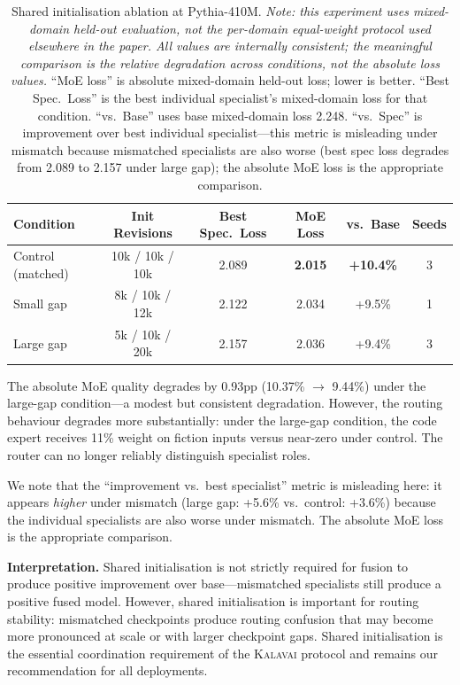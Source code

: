 \documentclass{article}
\newcommand{\kalavai}{\textsc{Kalavai}\xspace}
\begin{document}
\begin{table}[h]
\centering
\caption{Shared initialisation ablation at Pythia-410M. \emph{Note: this experiment uses mixed-domain held-out evaluation, not the per-domain equal-weight protocol used elsewhere in the paper. All values are internally consistent; the meaningful comparison is the relative degradation across conditions, not the absolute loss values.} ``MoE loss'' is absolute mixed-domain held-out loss; lower is better. ``Best Spec.\ Loss'' is the best individual specialist's mixed-domain loss for that condition. ``vs.\ Base'' uses base mixed-domain loss 2.248. ``vs.\ Spec'' is improvement over best individual specialist---this metric is misleading under mismatch because mismatched specialists are also worse (best spec loss degrades from 2.089 to 2.157 under large gap); the absolute MoE loss is the appropriate comparison.}
\label{tab:sharedinit}
\begin{tabular}{lccccc}
\toprule
\textbf{Condition} & \textbf{Init Revisions} & \textbf{Best Spec.\ Loss} & \textbf{MoE Loss} & \textbf{vs.\ Base} & \textbf{Seeds} \\
\midrule
Control (matched)  & 10k / 10k / 10k         & 2.089          & \textbf{2.015} & \textbf{+10.4\%} & 3 \\
Small gap          & 8k / 10k / 12k          & 2.122          & 2.034          & +9.5\%           & 1 \\
Large gap          & 5k / 10k / 20k          & 2.157          & 2.036          & +9.4\%           & 3 \\
\bottomrule
\end{tabular}
\end{table}

The absolute MoE quality degrades by 0.93pp (10.37\% $\rightarrow$ 9.44\%) under the large-gap condition---a modest but consistent degradation. However, the routing behaviour degrades more substantially: under the large-gap condition, the code expert receives 11\% weight on fiction inputs versus near-zero under control. The router can no longer reliably distinguish specialist roles.

We note that the ``improvement vs.\ best specialist'' metric is misleading here: it appears \emph{higher} under mismatch (large gap: +5.6\% vs.\ control: +3.6\%) because the individual specialists are also worse under mismatch. The absolute MoE loss is the appropriate comparison.

\textbf{Interpretation.} Shared initialisation is not strictly required for fusion to produce positive improvement over base---mismatched specialists still produce a positive fused model. However, shared initialisation is important for routing stability: mismatched checkpoints produce routing confusion that may become more pronounced at scale or with larger checkpoint gaps. Shared initialisation is the essential coordination requirement of the \kalavai protocol and remains our recommendation for all deployments.
\end{document}

